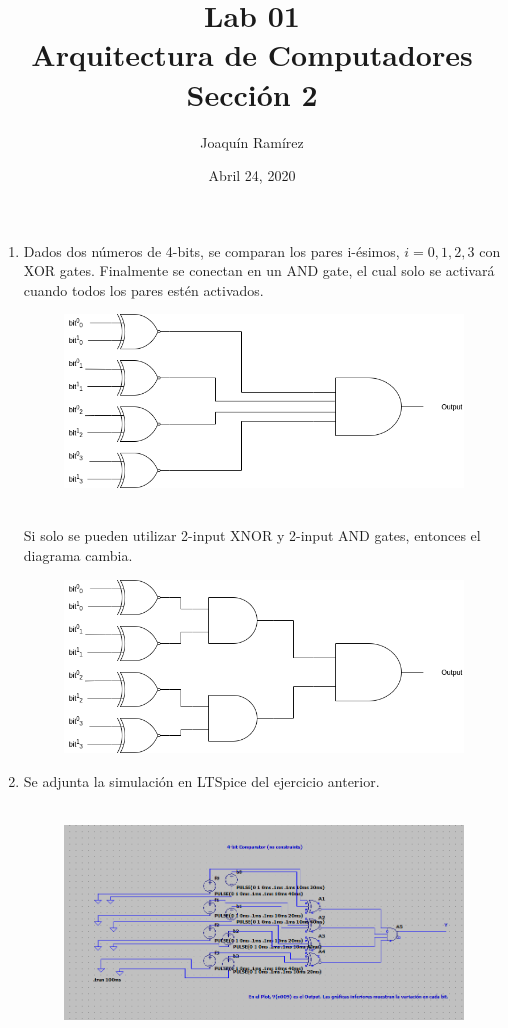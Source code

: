 \documentclass[11pt,a4paper]{article}
\title{Lab 01\\Arquitectura de Computadores \\ Sección 2}
\author{Joaquín Ramírez}
\date{Abril 24, 2020}
\begin{document}
\maketitle
\begin{enumerate}
\item Dados dos números de 4-bits, se comparan los pares i-ésimos, $i = 0, 1, 2, 3$ con XOR gates. Finalmente se conectan en un AND gate, el cual solo se activará cuando todos los pares estén activados.
\begin{figure}[h!]
\centering
\includegraphics[scale=0.4]{1.png} 
\end{figure}
\\
Si solo se pueden utilizar 2-input XNOR y 2-input AND gates, entonces el diagrama cambia.
\begin{figure}[h!]
\centering
\includegraphics[scale=0.4]{0.png} 
\end{figure}
\item Se adjunta la simulación en LTSpice del ejercicio anterior.
\\
\\
\begin{figure}[h!]
\centering
\includegraphics[scale=0.4]{dia11.png} 

\end{figure}
\end{enumerate}
\end{document}
